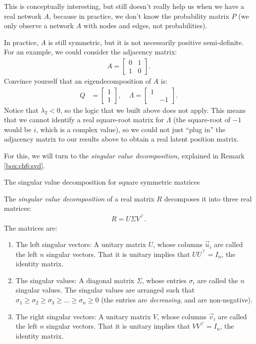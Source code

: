 This is conceptually interesting, but still doesn't really help us when we have a real network $A$, because in practice, we don't know the probability matrix $P$ (we only observe a network $A$ with nodes and edges, not probabilities). 

In practice, $A$ is still symmetric, but it is not necessarily positive semi-definite. For an example, we could consider the adjacency matrix:
\begin{align*}
    A = \begin{bmatrix}
        0 & 1 \\
        1 & 0
    \end{bmatrix}.
\end{align*}
Convince yourself that an eigendecomposition of $A$ is:
\begin{align*}
    Q &= \begin{bmatrix}
        1 \\ 1
    \end{bmatrix},\;\;\;\;\Lambda = \begin{bmatrix}
        1 & \\
        & -1
    \end{bmatrix}.    
\end{align*}
Notice that $\lambda_2 < 0$, so the logic that we built above does not apply. This means that we cannot identify a real square-root matrix for $\Lambda$ (the square-root of $-1$ would be $i$, which is a complex value), so we could not just ``plug in'' the adjacency matrix to our results above to obtain a real latent position matrix. 

For this, we will turn to the \textit{singular value decomposition}, explained in Remark \ref{box:ch6:svd}.

\begin{floatingbox}[h]\caption{The singular value decomposition for square symmetric matrices}
\label{box:ch6:svd}
The \textit{singular value decomposition} of a real matrix $R$ decomposes it into three real matrices:
\begin{align*}
    R = U \Sigma V^\top.
\end{align*}
The matrices are:
\begin{enumerate}
    \item The left singular vectors: A unitary matrix $U$, whose columns $\vec u_i$ are called the left $n$ singular vectors. That it is unitary implies that $UU^\top = I_n$, the identity matrix.
    \item The singular values: A diagonal matrix $\Sigma$, whose entries $\sigma_i$ are called the $n$ singular values. The singular values are arranged such that $\sigma_1 \geq \sigma_2 \geq \sigma_3 \geq ... \geq \sigma_n \geq 0$ (the entries are \textit{decreasing}, and are non-negative).
    \item The right singular vectors: A unitary matrix $V$, whose columns $\vec v_i$ are called the left $n$ singular vectors. That it is unitary implies that $VV^\top = I_n$, the identity matrix.
\end{enumerate}
\end{floatingbox}

